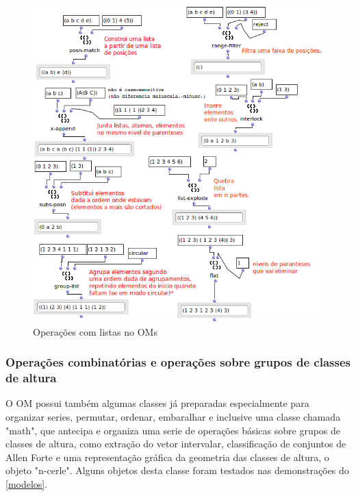 \documentclass[
	12pt,				%
	openright,			%
	twoside,			%
	a4paper,			%
	english,			%
	french,				%
	spanish,			%
	brazil				%
	]{abntex2}
\begin{document}
\begin{figure}[!h]
	\caption{\label{fig_grafico}Operações com listas no OMs}
	\begin{center}
	    \includegraphics[scale=0.7]{OMPD/OM-listas01.png}
	\end{center}
\end{figure}


\subsubsection{Operações combinatórias e operações sobre grupos de classes de altura }
\label{OMmath}
O OM possui também algumas classes já preparadas especialmente para organizar series, permutar, ordenar, embaralhar e inclusive uma classe chamada "math", que antecipa e organiza uma serie de operações básicas sobre grupos de classes de altura, como extração do vetor intervalar, classificação de conjuntos de Allen Forte e uma representação gráfica da geometria das classes de altura, o objeto "n-cerle"\cite{andreatta2003implementing}. Alguns objetos desta classe foram testados nas demonstrações do \autoref{modelos}.
\end{document}
